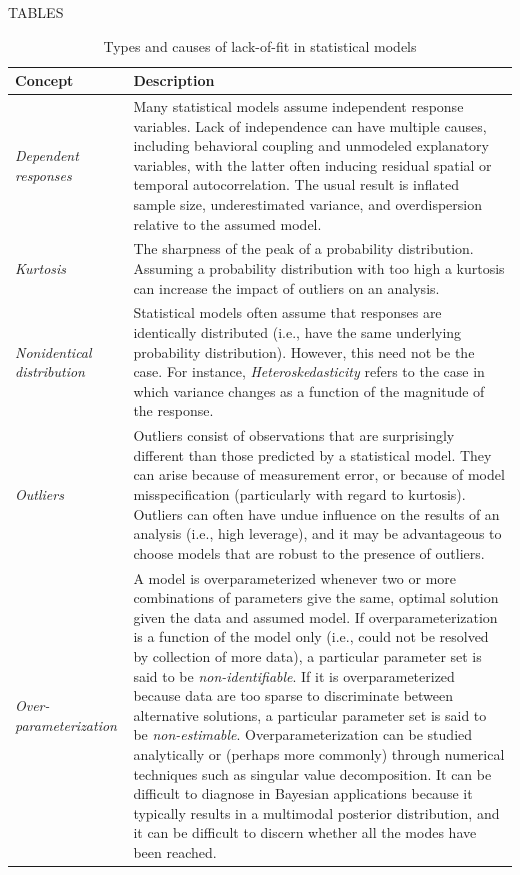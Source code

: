 \documentclass[12pt,english]{article}
\begin{document}
\begin{spacing}{1.9}
    \renewcommand{\refname}{Literature Cited}
    






    TABLES

    \begin{table}[htp]
      \caption{Types and causes of lack-of-fit in statistical models}
      \label{tab:lof}
      \centering
      \begin{tabular}{p{3cm}p{13cm}}
        \hline
        Concept & Description \\
        \hline
        \textit{Dependent responses} & Many statistical models assume independent response variables.  Lack of independence can have multiple causes, including behavioral coupling and unmodeled explanatory variables, with the latter often inducing residual spatial or temporal autocorrelation.  The usual result is inflated sample size, underestimated variance, and overdispersion relative to the assumed model. \\
        \textit{Kurtosis} & The sharpness of the peak of a probability distribution. Assuming a probability distribution with too high a kurtosis can increase the impact of outliers on an analysis.\\
        \textit{Nonidentical distribution} & Statistical models often assume that responses are identically distributed (i.e., have the same underlying probability distribution). However, this need not be the case.  For instance,         \textit{Heteroskedasticity} refers to the case in which variance changes as a function of the magnitude of the response.\\
        \textit{Outliers} & Outliers consist of observations that are surprisingly different than those predicted by a statistical model.  They can arise because of measurement error, or because of model misspecification (particularly with regard to kurtosis).  Outliers can often have undue influence on the results of an analysis (i.e., high leverage), and it may be advantageous to choose models that are robust to the presence of outliers. \\
        \textit{Over-parameterization} & A model is overparameterized whenever two or more combinations of parameters give the same, optimal solution given the data and assumed model.  If overparameterization is a function of the model only (i.e., could not be resolved by collection of more data), a particular parameter set is said to be \textit{non-identifiable}.  If it is overparameterized because data are too sparse to discriminate between alternative solutions, a particular parameter set is said to be \textit{non-estimable}.  Overparameterization can be studied analytically or (perhaps more commonly) through numerical techniques such as singular value decomposition.  It can be difficult to diagnose in Bayesian applications because it typically results in a multimodal posterior distribution, and it can be difficult to discern whether all the modes have been reached. \\

\end{tabular}
\end{table}
\end{spacing}
\end{document}
